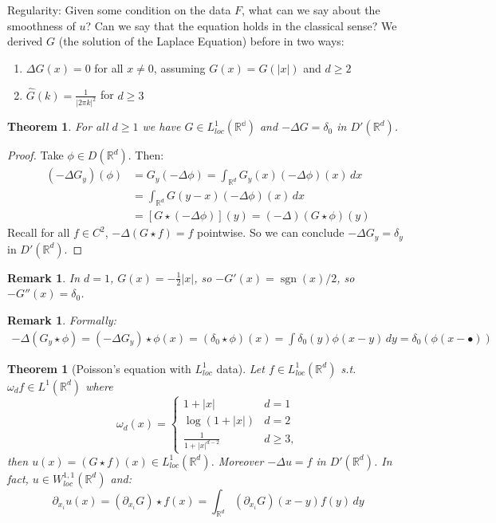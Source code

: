 \documentclass{report}
\theoremstyle{tommy}
\newtheorem{thm}[defn]{Theorem}
\newtheorem{rem}[defn]{Remark}
\newcommand{\sgn}{\operatorname{sgn}}
\begin{document}
  Regularity: Given some condition on the data \(F\), what can we say about the smoothness of \(u\)? Can we say that the equation holds in the classical sense? We derived \(G\) (the solution of the Laplace Equation) before in two ways:
  \begin{enumerate}
    \item \(\Delta G(x) = 0\) for all \(x \ne 0\), assuming \(G(x) = G(|x|)\) and \(d \ge 2\)
    \item \(\hat G(k) = \frac{1}{|2\pi k|^2}\) for \(d \ge 3\)
  \end{enumerate}
  
  \begin{thm}
    For all \(d \ge 1\) we have \(G \in L_{loc}^1(\mathbb{R^d})\) and \(- \Delta G = \delta_0\) in \(D'(\mathbb{R}^d)\).
  \end{thm}

  \begin{proof}
    Take \(\phi \in D(\mathbb{R}^d)\). Then:
    \begin{align*}
      (- \Delta G_y)(\phi) 
      &= G_y(-\Delta \phi)
      = \int_{\mathbb{R}^d} G_y(x) (-\Delta \phi)(x) \, dx \\
      &= \int_{\mathbb{R}^d} G(y-x) (-\Delta \phi)(x) \, dx \\
      &= [G \star (-\Delta \phi)](y) = (-\Delta)(G \star \phi)(y)
    \end{align*}
    Recall for all \(f \in C^2\), \(-\Delta (G \star f) = f\) pointwise. So we can conclude \(-\Delta G_y = \delta_y\) in \(D'(\mathbb{R}^d)\).
  \end{proof}
  
  \begin{rem}
    In \(d = 1\), \(G(x) = - \frac{1}{2}|x|\), so \(-G'(x) = \sgn(x)/2\), so \(-G''(x) = \delta_0\).
  \end{rem}

  \begin{rem}
    Formally: 
    \begin{align*}
      -\Delta(G_y \star \phi) = (-\Delta G_y) \star \phi(x) = (\delta_0 \star \phi)(x) = \int \delta_0(y) \phi(x - y) \, dy = \delta_0 (\phi(x-\bullet))
    \end{align*}
  \end{rem}

  \begin{thm}[Poisson's equation with \(L_{loc}^1\) data]\label{PoissonsequationwithL1locdata}
    Let \(f \in L_{loc}^1(\mathbb{R}^d)\) s.t. \(\omega_d f \in L^1(\mathbb{R}^d)\) where 
    \[\omega_d(x) = \begin{cases}
      1 + |x| & d = 1 \\ \log(1 + |x|) & d=2 \\ \frac{1}{1 + |x|^{d-2}} & d \ge 3,
    \end{cases}\]
    then \(u(x) = (G\star f)(x) \in L_{loc}^1(\mathbb{R}^d)\). Moreover \(-\Delta u = f\) in \(D'(\mathbb{R}^d)\). In fact, \(u \in W_{loc}^{1,1}(\mathbb{R}^d)\) and:
    \[\partial_{x_i} u(x) = (\partial_{x_i} G) \star f(x) = \int_{\mathbb{R}^d} (\partial_{x_i} G)(x-y)f(y) \, dy\]
  \end{thm}
\end{document}
